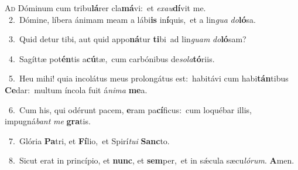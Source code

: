 \lettrine{\initial\textcolor{\initialcolor}{A}}{d} Dóminum cum tribu\-\textbf{lá}\-rer cla\-\textbf{má}\-vi:~\star et \textit{ex}\-\textit{au}\textbf{dí}vit me.\\
{\numbfont\textcolor{\numbcolor}{~2.}}~Dómine, líbera ánimam meam a lábi\textbf{is} in\-\textbf{í}\-quis,~\star et a lin\textit{gua} \textit{do}\-\textbf{ló}sa.\par
{\numbfont\textcolor{\numbcolor}{~3.}}~Quid detur tibi, aut quid appo\-\textbf{ná}\-tur \textbf{ti}\-bi~\star ad lin\textit{guam} \textit{do}\-\textbf{ló}sam?\par
{\numbfont\textcolor{\numbcolor}{~4.}}~Sagíttæ pot\-\textbf{én}\-tis a\-\textbf{cú}\-tæ,~\star cum carbónibus de\-\textit{so}\-\textit{la}\textbf{tó}riis.\par
{\numbfont\textcolor{\numbcolor}{~5.}}~Heu mihi! quia incolátus meus prolongátus est:~\dagger habitávi cum habi\-\textbf{tán}\-tibus \textbf{Ce}\-dar:~\star multum íncola fuit á\-\textit{ni}\-\textit{ma} \textbf{me}\-a.\par
{\numbfont\textcolor{\numbcolor}{~6.}}~Cum his, qui odérunt pacem, \textbf{e}\-ram pa\-\textbf{cí}\-ficus:~\star cum loquébar illis, impugná\textit{bant} \textit{me} \textbf{gra}\-tis.\par
{\numbfont\textcolor{\numbcolor}{~7.}}~Glória \textbf{Pa}\-tri, et \textbf{Fí}\-lio,~\star et Spirí\-\textit{tu}\-\textit{i} \textbf{Sanc}\-to.\par
{\numbfont\textcolor{\numbcolor}{~8.}}~Sicut erat in princípio, et \textbf{nunc}\-, et \textbf{sem}\-per,~\star et in sǽcula sæcu\-\textit{ló}\-\textit{rum}. \textbf{A}\-men.\par
